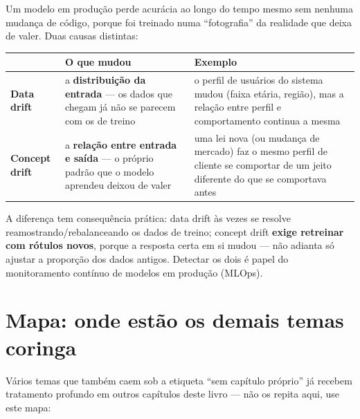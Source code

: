 \begin{conceito}
Um modelo em produção perde acurácia ao longo do tempo mesmo sem nenhuma
mudança de código, porque foi treinado numa “fotografia” da realidade que
deixa de valer. Duas causas distintas:

\begin{center}
\begin{tabular}{@{}p{2.6cm}p{4.2cm}p{4.8cm}@{}}
\toprule
& \textbf{O que mudou} & \textbf{Exemplo} \\
\midrule
\textbf{Data drift} & a \textbf{distribuição da entrada} --- os dados que
chegam já não se parecem com os de treino & o perfil de usuários do
sistema mudou (faixa etária, região), mas a relação entre perfil e
comportamento continua a mesma \\
\textbf{Concept drift} & a \textbf{relação entre entrada e saída} --- o
próprio padrão que o modelo aprendeu deixou de valer & uma lei nova (ou
mudança de mercado) faz o mesmo perfil de cliente se comportar de um jeito
diferente do que se comportava antes \\
\bottomrule
\end{tabular}
\end{center}

A diferença tem consequência prática: data drift às vezes se resolve
reamostrando/rebalanceando os dados de treino; concept drift \textbf{exige
retreinar com rótulos novos}, porque a resposta certa em si mudou --- não
adianta só ajustar a proporção dos dados antigos. Detectar os dois é papel
do monitoramento contínuo de modelos em produção (MLOps).
\end{conceito}

\section{Mapa: onde estão os demais temas coringa}

Vários temas que também caem sob a etiqueta “sem capítulo próprio” já
recebem tratamento profundo em outros capítulos deste livro --- não os
repita aqui, use este mapa:

